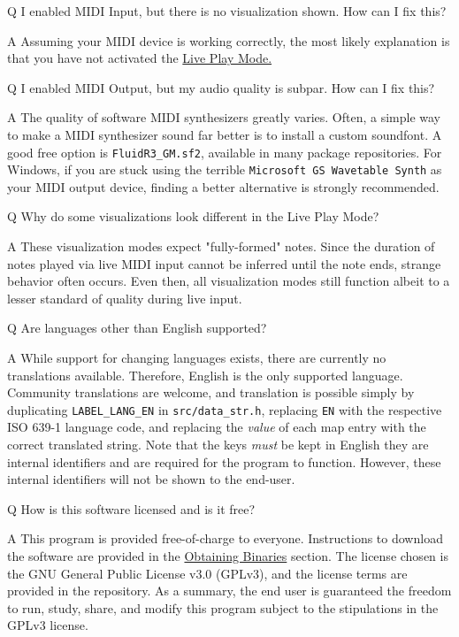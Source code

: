 \documentclass[english]{article}
\newcommand\faqQ[1]{%
  \leavevmode\par
  \noindent
{\hspace{4pt}\Large Q} \raisebox{0.1em}{\textendash{}} {\large #1}\par \vspace{-0.5em}}
\newcommand\faqA[2][]{%
  \leavevmode\par\noindent
  {\leftskip30pt
  {\large A} \raisebox{0.05em}{\textendash{}} \textbf{#1}#2\par \vspace{-0.25em}}}
\providecommand{\mi}[1]{\texttt{#1}}
\begin{document}
\faqQ{I enabled MIDI Input, but there is no visualization shown. How can I fix this?}

\faqA{Assuming your MIDI device is working correctly, the most likely explanation is that you have not activated the
\textcolor{lcol}{\hyperref[subsec:liveplay]{Live Play Mode.}}}

\faqQ{I enabled MIDI Output, but my audio quality is subpar. How can I fix this?}

\faqA{The quality of software MIDI synthesizers greatly varies. Often, a simple way to make a MIDI synthesizer sound
far better is to install a custom soundfont. A good free option is \mi{FluidR3_GM.sf2}, available in many
package repositories. For Windows, if you are stuck using the terrible \mi{Microsoft GS Wavetable Synth} as your
MIDI output device, finding a better alternative is strongly recommended.}

\faqQ{Why do some visualizations look different in the Live Play Mode?}

\faqA{These visualization modes expect "fully-formed" notes.
Since the duration of notes played via live MIDI input cannot be inferred until the note ends, 
strange behavior often occurs. Even then,
all visualization modes still function \textendash{} albeit to a lesser standard of quality \textendash{} during live input. 
}

\faqQ{Are languages other than English supported?}

\faqA{While support for changing languages exists, there are currently no translations available. Therefore,
English is the only supported language. Community translations are welcome, and translation is possible simply by
duplicating \mi{LABEL_LANG_EN} in \mi{src/data_str.h}, replacing \mi{EN} with the respective ISO 639-1 language code,
and replacing the \textit{value} of each map entry with the correct translated string. Note that the keys \textit{must} be
kept in English \textendash{} they are internal identifiers and are required for the program to function. However, these internal
identifiers will not be shown to the end-user.}

\faqQ{How is this software licensed and is it free?}

\faqA{This program is provided free-of-charge to everyone. Instructions to download the software are provided in the
\textcolor{lcol}{\hyperref[sec:obtain]{Obtaining Binaries}} section. The license chosen is the GNU General 
Public License v3.0 (GPLv3), and the license terms are provided in the repository. As a summary, the end user is 
guaranteed the freedom to run, study, share, and modify this program subject to the stipulations in the GPLv3 license.}
\end{document}

